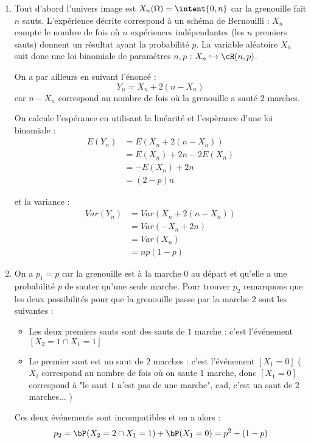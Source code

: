 \begin{correction}
\begin{enumerate}
\item Tout d'abord l'univers image est $X_n(\Omega)= \intent{0,n}$ car la grenouille fait $n$ sauts.
L'expérience décrite correspond à un schéma de Bernouilli : $X_n$ compte le nombre de fois où $n$  expériences indépendantes (les $n$ premiers sauts) donnent un résultat ayant la probabilité $p$. La variable aléatoire $X_n$ suit donc une loi binomiale de paramétres $n,p$ : $X_n\hookrightarrow \cB(n,p)$.

On a par ailleurs en suivant l'énoncé : 
$$Y_n = X_n +2 (n-X_n)$$
car $n-X_n$ correspond au nombre de fois où la grenouille a sauté 2 marches. 

On calcule l'espérance en utilisant la linéarité et l'espèrance d'une loi binomiale : 
\begin{align*}
E(Y_n) &= E(X_n + 2 (n-X_n)) \\
			&= E(X_n) +2n - 2 E(X_n)\\
			&=-E(X_n) +2n\\
			&= (2-p)n
\end{align*}

et la variance : 
\begin{align*}
Var(Y_n) &= Var(X_n + 2 (n-X_n)) \\
			&= Var( -X_n +2n) \\
			&=Var(X_n)\\
			&= np(1-p)
\end{align*}

\item On a $p_1=p$ car la grenouille est à la marche $0$ au départ et qu'elle a une probabilité $p$ de sauter qu'une seule marche. 
Pour trouver $p_2$ remarquons que les deux possibilités pour que la grenouille passe par la marche $2$ sont les suivantes : 
\begin{itemize}
\item Les deux premiers sauts sont des sauts de $1$ marche : c'est l'événement $[X_2=1 \cap X_1 = 1]$
\item Le premier saut est un saut de $2$ marches : c'est l'événement $[X_1=0]$ ($X_i$ correspond au nombre de fois où on saute 1 marche, donc $[X_1 = 0]$ correspond à "le saut $1$ n'est pas de une marche", cad, c'est un saut de 2 marches... ) 
\end{itemize}
Ces deux événements sont incompatibles et on a alors :
$$p_2 =  \bP (X_2 =2 \cap X_1 =1)  +\bP(X_1=0) = p^2 +(1-p)$$


\end{enumerate}
\end{correction}
